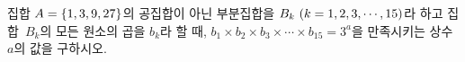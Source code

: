 집합 $A=\{1{,}\mkern3mu\mathopen{}3{,}\mkern3mu\mathopen{}9{,}\mkern3mu\mathopen{}27\}$의 공집합이 아닌 부분집합을 $B_k\ (k=1{,}\mkern3mu\mathopen{}2{,}\mkern3mu\mathopen{}3{,}\mkern3mu\mathopen{}\cdots{,}\mkern3mu\mathopen{}15)$라 하고 집합~$B_k$의 모든 원소의 곱을 $b_k$라 할 때, $b_1\times b_2\times b_3\times\cdots\times b_{15}=3^a$을 만족시키는 상수 $a$의 값을 구하시오.
